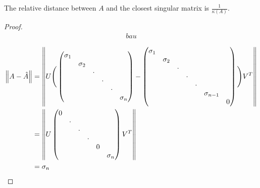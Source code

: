 \documentclass[computational_mathematics.tex]{subfiles}
\begin{document}
\begin{proposition}
The relative distance between $A$ and the closest singular matrix is $\frac{1}{\kappa(A)}$.
\end{proposition}
\begin{proof}


\begin{equation}
  \begin{aligned}
bau
  \end{aligned}
\end{equation}

\begin{equation}
  \begin{aligned}
    \left\lVert A - \hat{A}\right\rVert &= \left\lVert U 
    \Bigg(
    \begin{pmatrix}
      \sigma_1 &&&&&\\
      & \sigma_2&&&&\\
      && \cdot&&&\\
      &&& \cdot&&\\
      &&&& \cdot&\\
      &&&&& \sigma_n\\
    \end{pmatrix} -
    \begin{pmatrix}
      \sigma_1 &&&&&\\
      & \sigma_2&&&&\\
      && \cdot&&&\\
      &&& \cdot&&\\
      &&&& \cdot&\\
      &&&&& \sigma_{n-1}\\
      &&&&&& 0\\
    \end{pmatrix} \Bigg) {V}^{T}\right\rVert\\
    &= \left\lVert U 
    \begin{pmatrix}
      0 &&&&&\\
      & \cdot &&&&\\
      && \cdot&&&\\
      &&& \cdot&&\\
      &&&& 0&\\
      &&&&& \sigma_n\\
    \end{pmatrix} {V}^{T}\right\rVert\\
    &= \sigma_n\\
  \end{aligned}
\end{equation}


\end{proof}
\end{document}
